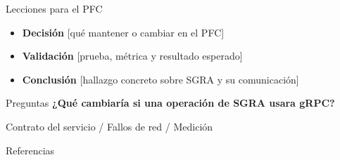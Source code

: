 \documentclass[aspectratio=169,12pt]{beamer}
\newif\ifguias
\newcommand{\turno}{}
\newcommand{\bloque}[1]{\renewcommand{\turno}{#1}}
\newcommand{\campo}[1]{\textcolor{Azul}{[#1]}}
\newcommand{\guia}[1]{\ifguias\par\medskip
  \begin{beamercolorbox}[wd=\linewidth,sep=1.05ex]{guia}
    \small\textbf{Para completar}\quad #1
  \end{beamercolorbox}\fi}
\begin{document}
\bloque{Integrante 4}
\begin{frame}{Lecciones para el PFC}
  \begin{itemize}
    \item \textbf{Decisión} \quad \campo{qué mantener o cambiar en el PFC}
    \item \textbf{Validación} \quad \campo{prueba, métrica y resultado esperado}
    \item \textbf{Conclusión} \quad \campo{hallazgo concreto sobre SGRA y su comunicación}
  \end{itemize}
  \guia{Vincula tu propuesta con un hallazgo anterior. Si propones gRPC, identifica entre qué componentes y bajo qué condición aportaría valor.}
\end{frame}

\bloque{Todo el equipo}
\begin{frame}{Preguntas}
  \textbf{¿Qué cambiaría si una operación de SGRA usara gRPC?}\par
  \medskip
  {\small Contrato del servicio \quad / \quad Fallos de red \quad / \quad Medición}
  \guia{Ensayen los cuatro bloques entre todos. Preparen también una pregunta crítica para otro equipo.}
\end{frame}

\appendix
\bloque{Anexo}
\begin{frame}[allowframebreaks=.95]{Referencias}
  \hypertarget{fuentes-teoria}{}
  \renewcommand{\bibfont}{\footnotesize}
  \setlength{\bibitemsep}{3pt}
  \printbibliography[heading=none]
  \smallskip
  \hyperlink{comparacion-teoria}{}
\end{frame}
\end{document}
